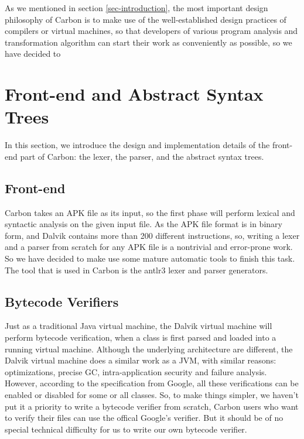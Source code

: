 \documentclass[preprint, cm]{sigplanconf}
\begin{document}
As we mentioned in section \ref{sec-introduction}, the
most important design philosophy of Carbon is to make
use of the well-established design practices of
compilers or virtual machines, so that developers
of various program analysis and transformation algorithm
can start their work as conveniently as possible, so we
have decided to 

\section{Front-end and Abstract Syntax Trees}
In this section, we introduce the design and implementation
details of the front-end part of Carbon: the lexer,
the parser, and the abstract syntax trees.

\subsection{Front-end}
Carbon takes an APK file as its input, so the first phase
will perform lexical and syntactic analysis on the given
input file. As the APK file format is in binary form, and 
Dalvik contains more than 200 different
instructions, so, writing a lexer and a parser from
scratch for any APK file
is a nontrivial and error-prone work. So we have decided
to make use some mature automatic tools to finish
this task. The tool that is used in Carbon is the antlr3
lexer and parser generators. 

\subsection{Bytecode Verifiers}
Just as a traditional Java virtual machine, the Dalvik virtual
machine will perform bytecode verification, when a class is first
parsed and loaded into a running virtual machine. Although
the underlying architecture are different, the Dalvik virtual
machine does a similar work as a JVM, with similar reasons: optimizations,
precise GC, intra-application security and failure analysis. However, according
to the specification from Google, all these verifications can
be enabled or disabled for some or all classes. So, to
make things simpler, we haven't put it a priority
to write 
a bytecode verifier from scratch, Carbon users who want to
verify their files can use the offical
Google's verifier. But it should be of no special technical
difficulty for us to write our own bytecode verifier.
\end{document}
